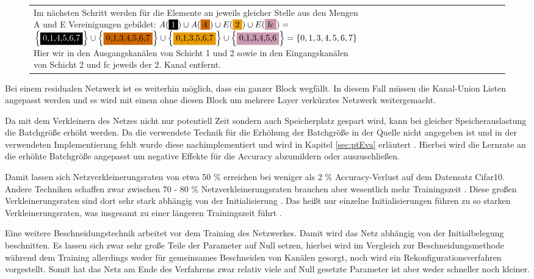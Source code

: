 \begin{figure}
\begin{minipage}[c]{1\linewidth}
\begin{tabularx}{1\linewidth}{m{0.22\linewidth}m{0.88\linewidth}}
{Im nächsten Schritt werden für die Elemente an jeweils gleicher Stelle aus den Mengen A und E Vereinigungen gebildet:
$A(\colorbox{black}{\textcolor{white}{1}})\cup A(\colorbox{vermi}{4}) \cup E(\colorbox{orange}{2}) \cup E(\colorbox{purple}{fc})=$\newline
$\left\{\colorbox{black}{\textcolor{white}{0,1,4,5,6,7}}\right\} \cup \left\{\colorbox{vermi}{0,1,3,4,5,6,7}\right\} \cup \left\{\colorbox{orange}{0,1,3,5,6,7}\right\} \cup \left\{\colorbox{purple}{0,1,3,4,5,6}\right\} = \left\{ 0,1,3,4,5,6,7\right\}$\newline
Hier wir in den Ausgangskanälen von Schicht 1 und 2 sowie in den Eingangskanälen von Schicht 2 und fc jeweils der 2. Kanal entfernt.}
\end{tabularx}
\end{minipage}
\end{figure}



Bei einem residualen Netzwerk ist es weiterhin möglich, dass ein ganzer Block wegfällt. In diesem Fall müssen die Kanal-Union Listen angepasst werden und es wird mit einem ohne diesen Block um mehrere Layer verkürztes Netzwerk weitergemacht.


Da mit dem Verkleinern des Netzes nicht nur potentiell Zeit sondern auch Speicherplatz gespart wird, kann bei gleicher Speicherauslastung die Batchgröße erhöht werden. Da die verwendete Technik für die Erhöhung der Batchgröße in der Quelle nicht angegeben ist und in der verwendeten Implementierung fehlt wurde diese nachimplementiert und wird in Kapitel \ref{sec:ptEva} erläutert \cite{ptImpl}. Hierbei wird die Lernrate an die erhöhte Batchgröße angepasst um negative Effekte für die Accuracy abzumildern oder auszuschließen. 

Damit lassen sich Netzverkleinerungsraten von etwa 50 \% erreichen bei weniger als 2 \% Accuracy-Verlust auf dem Datensatz Cifar10. Andere Techniken schaffen zwar zwischen 70 - 80 \% Netzverkleinerungsraten brauchen aber wesentlich mehr Trainingszeit \cite{lottery}. Diese großen Verkleinerungsraten sind dort sehr stark abhängig von der Initialisierung \cite{lottery}. Das heißt nur einzelne Initialisierungen führen zu so starken Verkleinerungsraten, was insgesamt zu einer längeren Trainingszeit führt \cite{lottery}. 


Eine weitere Beschneidungstechnik arbeitet vor dem Training des Netzwerkes\cite{snyc}. Damit wird das Netz abhängig von der Initialbelegung beschnitten. Es lassen sich zwar sehr große Teile der Parameter auf Null setzen, hierbei wird im Vergleich zur Beschneidungsmethode während dem Training allerdings weder für gemeinsames Beschneiden von Kanälen gesorgt, noch wird ein Rekonfigurationsverfahren vorgestellt. Somit hat das Netz am Ende des Verfahrens zwar relativ viele auf Null gesetzte Parameter ist aber weder schneller noch kleiner.


